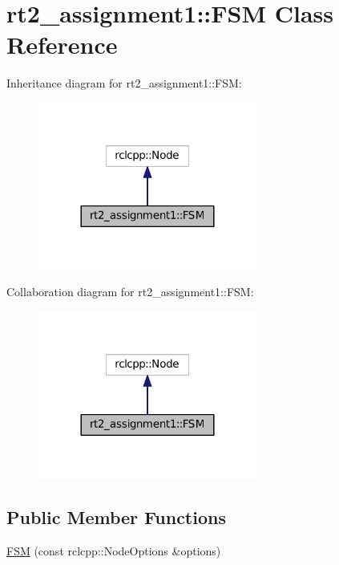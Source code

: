 \hypertarget{classrt2__assignment1_1_1_f_s_m}{}\section{rt2\+\_\+assignment1\+:\+:F\+SM Class Reference}
\label{classrt2__assignment1_1_1_f_s_m}


Inheritance diagram for rt2\+\_\+assignment1\+:\+:F\+SM\+:
\nopagebreak
\begin{figure}[H]
\begin{center}
\leavevmode
\includegraphics[width=204pt]{classrt2__assignment1_1_1_f_s_m__inherit__graph}
\end{center}
\end{figure}


Collaboration diagram for rt2\+\_\+assignment1\+:\+:F\+SM\+:
\nopagebreak
\begin{figure}[H]
\begin{center}
\leavevmode
\includegraphics[width=204pt]{classrt2__assignment1_1_1_f_s_m__coll__graph}
\end{center}
\end{figure}
\subsection*{Public Member Functions}
\begin{DoxyCompactItemize}
\item 
\hyperlink{classrt2__assignment1_1_1_f_s_m_a478e9cd5058c96962f690993f8c28517}{F\+SM} (const rclcpp\+::\+Node\+Options \&options)
\end{DoxyCompactItemize}


